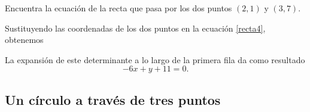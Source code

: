 \begin{examplebox}{}{}
    Encuentra la ecuación de la recta que pasa por los dos puntos $(2, 1)$ y $(3, 7)$.

    \tcblower
    \solucion Sustituyendo las coordenadas de los dos puntos en la ecuación \eqref{recta4}, obtenemos
    \begin{matrizn}
    \end{matrizn}
    La expansión de este determinante a lo largo de la primera fila da como resultado
    $$-6x + y + 11 = 0.$$
\end{examplebox}

\subsection*{Un círculo a través de tres puntos}

